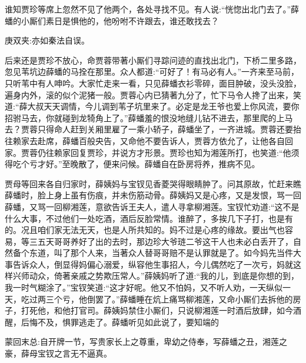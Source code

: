 \begin{parag}
    谁知贾珍等席上忽然不见了他两个，各处寻找不见。有人说:“恍惚出北门去了。”薛蟠的小厮们素日是惧他的，他吩咐不许跟去，谁还敢找去？\begin{note}庚双夹:亦如秦法自误。\end{note}后来还是贾珍不放心，命贾蓉带著小厮们寻踪问迹的直找出北门，下桥二里多路，忽见苇坑边薛蟠的马拴在那里。众人都道:“可好了！有马必有人。”一齐来至马前，只听苇中有人呻吟。大家忙走来一看，只见薛蟠衣衫零碎，面目肿破，没头没脸，遍身内外，滚的似个泥猪一般。贾蓉心内已猜著九分了，忙下马令人搀了出来，笑道:“薛大叔天天调情，今儿调到苇子坑里来了。必定是龙王爷也爱上你风流，要你招驸马去，你就碰到龙犄角上了。”薛蟠羞的恨没地缝儿钻不进去，那里爬的上马去？贾蓉只得命人赶到关厢里雇了一乘小轿子，薛蟠坐了，一齐进城。贾蓉还要抬往赖家去赴席，薛蟠百般央告，又命他不要告诉人，贾蓉方依允了，让他各自回家。贾蓉仍往赖家回复贾珍，并说方才形景。贾珍也知为湘莲所打，也笑道:“他须得吃个亏才好。”至晚散了，便来问候。薛蟠自在卧房将养，推病不见。
\end{parag}


\begin{parag}
    贾母等回来各自归家时，薛姨妈与宝钗见香菱哭得眼睛肿了。问其原故，忙赶来瞧薛蟠时，脸上身上虽有伤痕，并未伤筋动骨。薛姨妈又是心疼，又是发恨，骂一回薛蟠，又骂一回柳湘莲，意欲告诉王夫人，遣人寻拿柳湘莲。宝钗忙劝道:“这不是什么大事，不过他们一处吃酒，酒后反脸常情。谁醉了，多挨几下子打，也是有的。况且咱们家无法无天，也是人所共知的。妈不过是心疼的缘故。要出气也容易，等三五天哥哥养好了出的去时，那边珍大爷琏二爷这干人也未必白丢开了，自然备个东道，叫了那个人来，当著众人替哥哥赔不是认罪就是了。如今妈先当件大事告诉众人，倒显得妈偏心溺爱，纵容他生事招人，今儿偶然吃了一次亏，妈就这样兴师动众，倚著亲戚之势欺压常人。”薛姨妈听了道:“我的儿，到底是你想的到，我一时气糊涂了。”宝钗笑道:“这才好呢。他又不怕妈，又不听人劝，一天纵似一天，吃过两三个亏，他倒罢了。”薛蟠睡在炕上痛骂柳湘莲，又命小厮们去拆他的房子，打死他，和他打官司。薛姨妈禁住小厮们，只说柳湘莲一时酒后放肆，如今酒醒，后悔不及，惧罪逃走了。薛蟠听见如此说了，要知端的
\end{parag}


\begin{parag}
    \begin{note}蒙回末总:自开牌一节，写贵家长上之尊重，卑幼之侍奉，写薛蟠之丑，湘莲之豪，薛母宝钗之言无不逼真。\end{note}
\end{parag}

